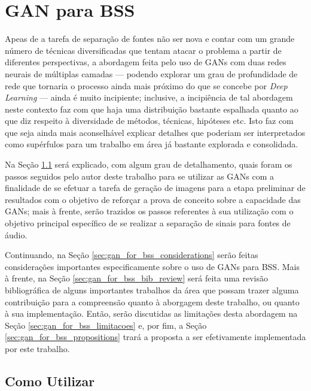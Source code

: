 \chapter{GAN para BSS}
\label{cha:gan_for_bss}

Apeas de a tarefa de separação de fontes não ser nova e contar com um grande número de técnicas diversificadas que tentam atacar o problema a partir de diferentes perspectivas, a abordagem feita pelo uso de GANs com duas redes neurais de múltiplas camadas --- podendo explorar um grau de profundidade de rede que tornaria o processo ainda mais próximo do que se concebe por \textit{Deep Learning} --- ainda é muito incipiente; inclusive, a incipiência de tal abordagem neste contexto faz com que haja uma distribuição bastante espalhada quanto ao que diz respeito à diversidade de métodos, técnicas, hipóteses etc. Isto faz com que seja ainda mais aconselhável explicar detalhes que poderiam ser interpretados como supérfulos para um trabalho em área já bastante explorada e consolidada.

Na Seção \ref{sec:gan_for_bss_how_to_use} será explicado, com algum grau de detalhamento, quais foram os passos seguidos pelo autor deste trabalho para se utilizar as GANs com a finalidade de se efetuar a tarefa de geração de imagens para a etapa preliminar de resultados com o objetivo de reforçar a prova de conceito sobre a capacidade das GANs; mais à frente, serão trazidos os passos referentes à sua utilização com o objetivo principal específico de se realizar a separação de sinais para fontes de áudio.

Continuando, na Seção \ref{sec:gan_for_bss_considerations} serão feitas considerações importantes especificamente sobre o uso de GANs para BSS. Mais à frente, na Seção \ref{sec:gan_for_bss_bib_review} será feita uma revisão bibliográfica de alguns importantes trabalhos da área que possam trazer alguma contribuição para a compreensão quanto à aborgagem deste trabalho, ou quanto à sua implementação. Então, serão discutidas as limitações desta abordagem na Seção \ref{sec:gan_for_bss_limitacoes} e, por fim, a Seção \ref{sec:gan_for_bss_propositions} trará a proposta a ser efetivamente implementada por este trabalho.



\section{Como Utilizar}
\label{sec:gan_for_bss_how_to_use}

